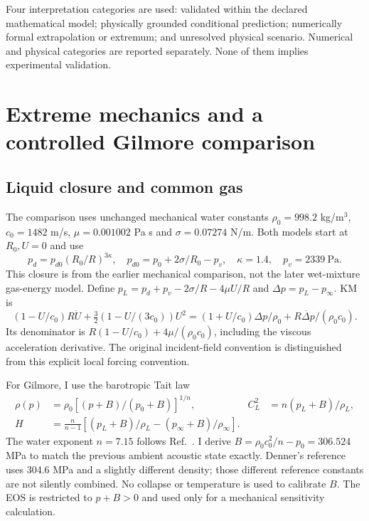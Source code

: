 \documentclass[10pt,a4paper]{article}
\begin{document}
Four interpretation categories are used: validated within the declared mathematical model; physically grounded conditional prediction; numerically formal extrapolation or extremum; and unresolved physical scenario. Numerical and physical categories are reported separately. None of them implies experimental validation.
\clearpage
\section{Extreme mechanics and a controlled Gilmore comparison}
\subsection{Liquid closure and common gas}
The comparison uses unchanged mechanical water constants $\rho_0=998.2$ kg/m$^3$, $c_0=1482$ m/s, $\mu=0.001002$ Pa s and $\sigma=0.07274$ N/m. Both models start at $R_0, U=0$ and use
\begin{equation}
p_d=p_{d0}(R_0/R)^{3\kappa},\quad p_{d0}=p_0+2\sigma/R_0-p_v,\quad
\kappa=1.4,\quad p_v=2339\ \mathrm{Pa}.
\end{equation}
This closure is from the earlier mechanical comparison, not the later wet-mixture gas-energy model.
Define $p_L=p_d+p_v-2\sigma/R-4\mu U/R$ and $\Delta p=p_L-p_\infty$. KM is
\begin{equation}
(1-U/c_0)R\dot U+\tfrac32(1-U/(3c_0))U^2=(1+U/c_0)\Delta p/\rho_0+R\dot{\Delta p}/(\rho_0c_0).
\end{equation}
Its denominator is $R(1-U/c_0)+4\mu/(\rho_0c_0)$, including the viscous acceleration derivative. The original incident-field convention \cite{km} is distinguished from this explicit local forcing convention.

For Gilmore, I use the barotropic Tait law
\begin{align}
\rho(p)&=\rho_0[(p+B)/(p_0+B)]^{1/n},& C_L^2&=n(p_L+B)/\rho_L,\\
H&=\frac{n}{n-1}[(p_L+B)/\rho_L-(p_\infty+B)/\rho_\infty].
\end{align}
The water exponent $n=7.15$ follows Ref.~\cite{denner}. I derive $B=\rho_0c_0^2/n-p_0=306.524$ MPa to match the previous ambient acoustic state exactly. Denner's reference uses 304.6 MPa and a slightly different density; those different reference constants are not silently combined. No collapse or temperature is used to calibrate $B$. The EOS is restricted to $p+B>0$ and used only for a mechanical sensitivity calculation.
\end{document}
